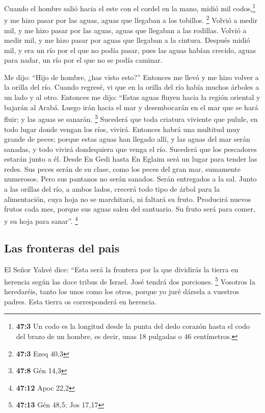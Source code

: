  Cuando el hombre salió hacia el este con el cordel en la
mano, midió mil codos,\footnote{\textbf{47:3} Un codo es la longitud
  desde la punta del dedo corazón hasta el codo del brazo de un hombre,
  es decir, unas 18 pulgadas o 46 centímetros.} y me hizo pasar por las
aguas, aguas que llegaban a los tobillos. \footnote{\textbf{47:3} Ezeq
  40,3}  Volvió a medir mil, y me hizo pasar por las
aguas, aguas que llegaban a las rodillas. Volvió a medir mil, y me hizo
pasar por aguas que llegaban a la cintura.  Después midió
mil, y era un río por el que no podía pasar, pues las aguas habían
crecido, aguas para nadar, un río por el que no se podía caminar.

 Me dijo: ``Hijo de hombre, ¿has visto esto?'' Entonces me
llevó y me hizo volver a la orilla del río.  Cuando
regresé, vi que en la orilla del río había muchos árboles a un lado y al
otro.  Entonces me dijo: ``Estas aguas fluyen hacia la
región oriental y bajarán al Arabá. Luego irán hacia el mar y
desembocarán en el mar que se hará fluir; y las aguas se sanarán.
\footnote{\textbf{47:8} Gén 14,3}  Sucederá que toda
criatura viviente que pulule, en todo lugar donde vengan los ríos,
vivirá. Entonces habrá una multitud muy grande de peces; porque estas
aguas han llegado allí, y las aguas del mar serán sanadas, y todo vivirá
dondequiera que venga el río.  Sucederá que los
pescadores estarán junto a él. Desde En Gedi hasta En Eglaim será un
lugar para tender las redes. Sus peces serán de su clase, como los peces
del gran mar, sumamente numerosos.  Pero sus pantanos no
serán sanados. Serán entregados a la sal.  Junto a las
orillas del río, a ambos lados, crecerá todo tipo de árbol para la
alimentación, cuya hoja no se marchitará, ni faltará su fruto. Producirá
nuevos frutos cada mes, porque sus aguas salen del santuario. Su fruto
será para comer, y su hoja para sanar''. \footnote{\textbf{47:12} Apoc
  22,2}

\hypertarget{las-fronteras-del-pais}{%
\subsection{Las fronteras del pais}\label{las-fronteras-del-pais}}

 El Señor Yahvé dice: ``Esta será la frontera por la que
dividirás la tierra en herencia según las doce tribus de Israel. José
tendrá dos porciones. \footnote{\textbf{47:13} Gén 48,5; Jos 17,17}
 Vosotros la heredaréis, tanto los unos como los otros,
porque yo juré dársela a vuestros padres. Esta tierra os corresponderá
en herencia.

